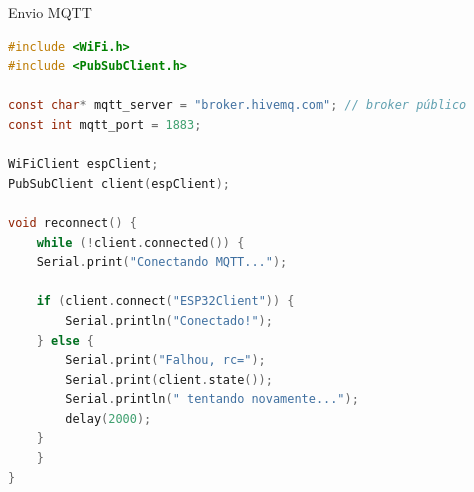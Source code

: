 \begin{frame}[fragile]{Envio MQTT}
\begin{lstlisting}[language=C, basicstyle=\tiny\ttfamily]
#include <WiFi.h>
#include <PubSubClient.h>

const char* mqtt_server = "broker.hivemq.com"; // broker público
const int mqtt_port = 1883;

WiFiClient espClient;
PubSubClient client(espClient);

void reconnect() {
    while (!client.connected()) {
    Serial.print("Conectando MQTT...");

    if (client.connect("ESP32Client")) {
        Serial.println("Conectado!");
    } else {
        Serial.print("Falhou, rc=");
        Serial.print(client.state());
        Serial.println(" tentando novamente...");
        delay(2000);
    }
    }
}
\end{lstlisting}
\end{frame}
        
        